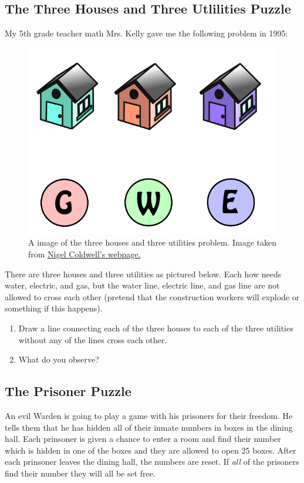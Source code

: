 \documentclass[]{article}
\numberwithin{equation}{section}
\theoremstyle{definition}
\theoremstyle{remark}
\begin{document}
\subsection{The Three Houses and Three Utlilities Puzzle}
	My 5th grade teacher math Mrs. Kelly gave me the following problem in 1995: 
	\begin{figure}[htbp!]
		\begin{center}
			\includegraphics[scale=0.25]{three-houses.png}
		\end{center}
		\caption{A image of the three houses and three utilities problem.  Image taken from \href{http://puzzles.nigelcoldwell.co.uk/twentysix.htm}{Nigel Coldwell's webpage.} }
	\end{figure}
	There are three houses and three utilities as pictured below.
	Each how needs water, electric, and gas, but the water line, electric line, and gas line are not allowed to cross each other (pretend that the construction workers will explode or something if this happens).
	\begin{enumerate}
	\item Draw a line connecting each of the three houses to each of the three utilities without any of the lines cross each other. 
	\item What do you observe?
	\end{enumerate}
	
\subsection{The Prisoner Puzzle }

An evil Warden is going to play a game with his prisoners for their freedom. 
He tells them that he has hidden all of their inmate numbers in boxes in the dining hall. Each prinsoner is given a chance to enter a room and find their number which is hidden in one of the boxes and they are allowed to open 25 boxes.
After each prinsoner leaves the dining hall, the numbers are reset. 
If \emph{all} of the prisoners find their number they will all be set free.
\end{document}
